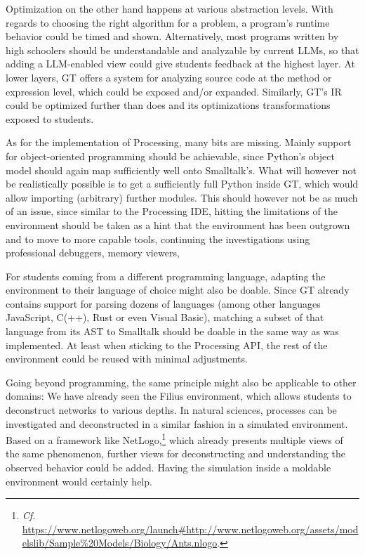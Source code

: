 Optimization on the other hand happens at various abstraction levels. With regards to choosing the right algorithm for a problem, a program's runtime behavior could be timed and shown. Alternatively, most programs written by high schoolers should be understandable and analyzable by current \acp{LLM}, so that adding a \ac{LLM}-enabled view could give students feedback at the highest layer. At lower layers, \ac{GT} offers a  system for analyzing source code at the method or expression level, which could be exposed and/or expanded. Similarly, \ac{GT}'s \ac{IR} could be optimized further than  does and its optimizations transformations exposed to students.

As for the implementation of Processing, many bits are missing. Mainly support for object-oriented programming should be achievable, since Python's object model should again map sufficiently well onto Smalltalk's. What will however not be realistically possible is to get a sufficiently full Python inside \ac{GT}, which would allow importing (arbitrary) further modules. This should however not be as much of an issue, since similar to the Processing \ac{IDE}, hitting the limitations of the environment should be taken as a hint that the environment has been outgrown and to move to more capable tools, continuing the investigations using professional debuggers, memory viewers, \etc

For students coming from a different programming language, adapting the environment to their language of choice might also be doable. Since \ac{GT} already contains support for parsing dozens of languages (among other languages JavaScript, C(++), Rust or even Visual Basic), matching a subset of that language from its \ac{AST} to Smalltalk should be doable in the same way as  was implemented. At least when sticking to the Processing \ac{API}, the rest of the environment could be reused with minimal adjustments.

Going beyond programming, the same principle might also be applicable to other domains: We have already seen the Filius environment, which allows students to deconstruct networks to various depths. In natural sciences, processes can be investigated and deconstructed in a similar fashion in a simulated environment. Based on a framework like NetLogo,\footnote{\emph{Cf.} \eg \url{https://www.netlogoweb.org/launch\#http://www.netlogoweb.org/assets/modelslib/Sample\%20Models/Biology/Ants.nlogo}.} which already presents multiple views of the same phenomenon, further views for deconstructing and understanding the observed behavior could be added. Having the simulation inside a moldable environment would certainly help.

